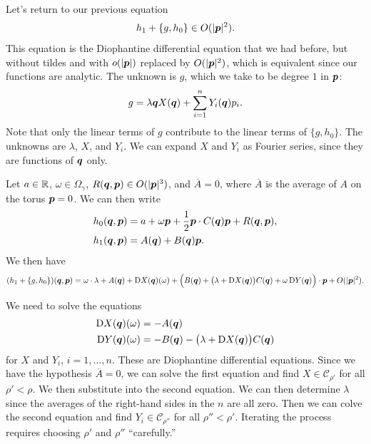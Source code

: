 \documentclass[twoside,letterpaper,10pt]{article}
\numberwithin{equation}{section}
\begin{document}
Let's return to our previous equation
\begin{equation*}
  h_1 + \{g, h_0\} \in O(|\bm{p}|^2).
\end{equation*}
This equation is the Diophantine differential equation that we had before, but
without tildes and with $o(|\bm{p}|)$ replaced by $O(|\bm{p}|^2)$, which is
equivalent since our functions are analytic.
The unknown is $g$, which we take to be degree $1$ in $\bm{p}$:
\begin{equation*}
  g = \lambda \bm{q} X(\bm{q}) + \sum_{i=1}^n Y_i(\bm{q}) p_i.
\end{equation*}
Note that only the linear terms of $g$ contribute to the linear terms of $\{g,
h_0\}$.
The unknowns are $\lambda$, $X$, and $Y_i$.
We can expand $X$ and $Y_i$ as Fourier series, since they are functions of
$\bm{q}$ only.

Let $a \in \mathbb{R}$, $\omega \in \Omega_{\gamma}$, $R(\bm{q}, \bm{p}) \in
O(|\bm{p}|^3)$, and $\overline{A} = 0$, where $\overline{A}$ is the average of
$A$ on the torus $\bm{p} = 0$.
We can then write
\begin{align*}
  h_0(\bm{q}, \bm{p}) &= a + \omega \bm{p} + \frac{1}{2} \bm{p} \cdot C(\bm{q})
                        \bm{p} + R(\bm{q}, \bm{p}),\\
  h_1(\bm{q}, \bm{p}) &= A(\bm{q}) + B(\bm{q}) \bm{p}.
\end{align*}
We then have
\begin{equation*}
  (h_1 + \{g, h_0\}) (\bm{q}, \bm{p}) = \omega \cdot \lambda + A(\bm{q}) + \mathop{}\!\mathrm{D}
  X(\bm{q}) (\omega) + \Big( B(\bm{q}) + \big(\lambda + \mathop{}\!\mathrm{D} X(\bm{q}) \big)
  C(\bm{q}) + \omega \mathop{}\!\mathrm{D} Y(\bm{q}) \Big) \cdot \bm{p} + O(|\bm{p}|^2).
\end{equation*}

We need to solve the equations
\begin{align*}
  \mathop{}\!\mathrm{D} X(\bm{q}) (\omega) &= - A(\bm{q})\\
  \mathop{}\!\mathrm{D} Y(\bm{q}) (\omega) &= -B(\bm{q}) - \big(\lambda + \mathop{}\!\mathrm{D}
     X(\bm{q})\big)C(\bm{q})
\end{align*}
for $X$ and $Y_i$, $i = 1, \ldots, n$.
These are Diophantine differential equations.
Since we have the hypothesis $\overline{A} = 0$, we can solve the first equation
and find $X \in \mathcal{C}_{\rho'}$ for all $\rho' < \rho$.
We then substitute into the second equation.
We can then determine $\lambda$ since the averages of the right-hand sides in
the $n$ are all zero.
Then we can colve the second equation and find $Y_i \in \mathcal{C}_{\rho''}$
for all $\rho'' < \rho'$.
Iterating the process requires choosing $\rho'$ and $\rho''$ ``carefully.''
\end{document}

